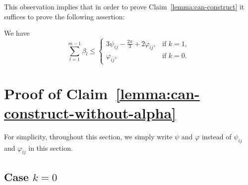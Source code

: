 
This observation implies that in order to prove Claim~\ref{lemma:can-construct} it suffices to prove the following assertion:

\begin{claim}\label{lemma:can-construct-without-alpha} We have
$$\sum_{l=1}^{m-1}{\beta_l}\leq\begin{cases}3\psi_{ij} - \frac{2\pi}{3} + 2\varphi_{ij}, & \textrm{if }k = 1, \\ \varphi_{ij}, & \textrm{if }k = 0.\end{cases}$$
\end{claim}

\section{Proof of Claim~\ref{lemma:can-construct-without-alpha}}

For simplicity, throughout this section, we simply write $\psi$ and $\varphi$ instead of $\psi_{ij}$ and $\varphi_{ij}$ in this section.

\subsection{Case $k = 0$}

